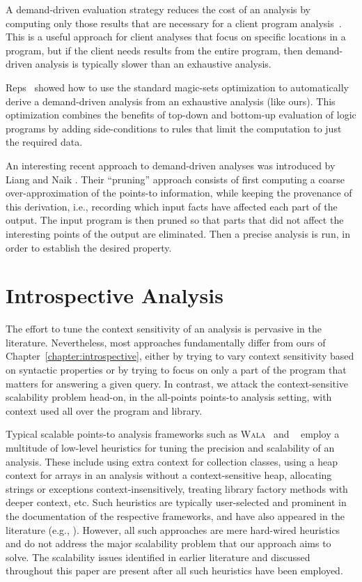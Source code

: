 A demand-driven evaluation strategy reduces the cost of an analysis by computing only those results that are necessary for a client program analysis~\cite{oopsla:2005:Sridharan,pldi:2006:Sridharan,popl:2008:Zheng,pldi:2001:Heintze}. This is a useful approach for client analyses that focus on specific locations in a program, but if the client needs results from the entire program, then demand-driven analysis is typically slower than an exhaustive analysis.

Reps~\cite{cc:1994:Reps} showed how to use the standard magic-sets optimization to automatically derive a demand-driven analysis from an exhaustive analysis (like ours). This optimization combines the benefits of top-down and bottom-up evaluation of logic programs by adding side-conditions to rules that limit the computation to just the required data.

An interesting recent approach to demand-driven analyses was introduced by Liang and Naik \cite{pldi:2011:Liang}. Their ``pruning'' approach consists of first computing a coarse over-approximation of the points-to information, while keeping the provenance of this derivation, i.e., recording which input facts have affected each part of the output. The input program is then pruned so that parts that did not affect the interesting points of the output are eliminated. Then a precise analysis is run, in order to establish the desired property.



\section{Introspective Analysis}
\label{sec:related:introspective}

The effort to tune the context sensitivity of an analysis is pervasive in the literature. Nevertheless, most approaches fundamentally differ from ours of Chapter~\ref{chapter:introspective}, either by trying to vary context sensitivity based on syntactic properties or by trying to focus on only a part of the program that matters for answering a given query. In contrast, we attack the context-sensitive scalability problem  head-on, in the all-points points-to analysis setting, with context used all over the program and library.

Typical scalable points-to analysis frameworks such as \textsc{Wala}~\cite{www:wala} and \doop{}~\cite{oopsla:2009:Bravenboer} employ a multitude of low-level heuristics for tuning the precision and scalability of an analysis. These include using extra context for collection classes, using a heap context for arrays in an analysis without a context-sensitive heap, allocating strings or exceptions context-insensitively, treating library factory methods with deeper context, etc. Such heuristics are typically user-selected and prominent in the documentation of the respective frameworks, and have also appeared in the literature (e.g., \cite{pldi:2009:Tripp,cc:2013:Kastrinis}). However, all such approaches are mere hard-wired heuristics and do not address the major scalability problem that our approach aims to solve. The scalability issues identified in earlier literature and discussed throughout this paper are present after all such heuristics have been employed.


